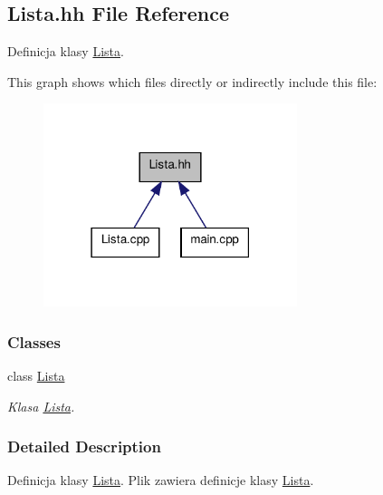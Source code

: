 \hypertarget{a00010}{\subsection{Lista.\-hh File Reference}
\label{a00010}
}


Definicja klasy \hyperlink{a00003}{Lista}.  


This graph shows which files directly or indirectly include this file\-:\nopagebreak
\begin{figure}[H]
\begin{center}
\leavevmode
\includegraphics[width=210pt]{a00021}
\end{center}
\end{figure}
\subsubsection*{Classes}
\begin{DoxyCompactItemize}
\item 
class \hyperlink{a00003}{Lista}
\begin{DoxyCompactList}\small\item\em Klasa \hyperlink{a00003}{Lista}. \end{DoxyCompactList}\end{DoxyCompactItemize}


\subsubsection{Detailed Description}
Definicja klasy \hyperlink{a00003}{Lista}. Plik zawiera definicje klasy \hyperlink{a00003}{Lista}. 